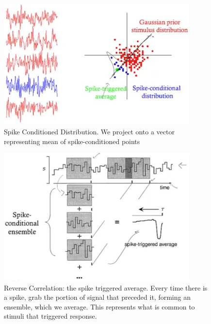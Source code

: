 \documentclass[]{article}
\begin{document}
\begin{figure}[H]
	\caption[Spike Conditioned Distribution]{Spike Conditioned Distribution. We project onto a vector representing mean of spike-conditioned points}\label{fig:spike:conditioned}
	\includegraphics[width=0.9\textwidth]{spike-conditioned-distribution}
\end{figure}

\begin{figure}[H]
	\caption[Reverse Correlation: the spike triggered average]{Reverse Correlation: the spike triggered average. Every time there is a spike, grab the portion of signal that preceded it, forming an ensemble, which we average. This represents what is common to stimuli that triggered response.}
	\includegraphics[width=0.9\textwidth]{reverse-correlation}
\end{figure}
\end{document}
